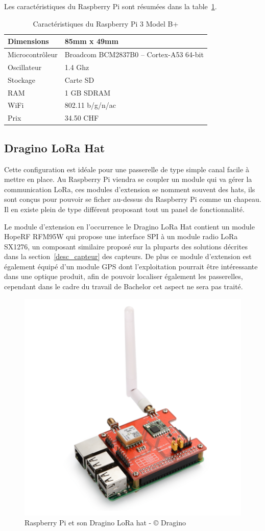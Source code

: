 Les caractéristiques du Raspberry Pi sont résumées dans la table~\ref{tab:raspberry_cara}.

\begin{table}[htb]
\caption[Caractéristiques du Raspberry Pi 3 Model B+]{Caractéristiques du Raspberry Pi 3 Model B+}
\label{tab:raspberry_cara}
\centering
\begin{tabular}{ l | l }
\toprule
Dimensions & 85mm x 49mm \\
\midrule
Microcontrôleur & Broadcom BCM2837B0 – Cortex-A53 64-bit \\
\midrule
Oscillateur & 1.4 Ghz \\
\midrule
Stockage & Carte SD \\
\midrule
RAM & 1 GB SDRAM \\
\midrule
WiFi & 802.11 b/g/n/ac \\
\midrule
Prix & 34.50 CHF\\
\bottomrule 
\end{tabular}
\end{table}

\subsection{Dragino LoRa Hat}

Cette configuration est idéale pour une passerelle de type simple canal facile à mettre en place. 
Au Raspberry Pi viendra se coupler un module qui va gérer la communication LoRa, ces modules d’extension se nomment souvent des hats, ils sont conçus pour pouvoir se ficher au-dessus du Raspberry Pi comme un chapeau. Il en existe plein de type différent proposant tout un panel de fonctionnalité. 

Le module d’extension en l’occurrence le Dragino LoRa Hat contient un module HopeRF RFM95W qui propose une interface SPI à un module radio LoRa SX1276, un composant similaire proposé sur la pluparts des solutions décrites dans la section~\ref{desc_capteur} des capteurs. De plus ce module d’extension est également équipé d’un module GPS dont l’exploitation pourrait être intéressante dans une optique produit, afin de pouvoir localiser également les passerelles, cependant dans le cadre du travail de Bachelor cet aspect ne sera pas traité.

\begin{figure}[htb]
\centering 
\includegraphics[width=0.5\columnwidth]{../images/RaspberryPI_DraginoHat.png} 
\caption[Raspberry Pi et son Dragino LoRa hat]{Raspberry Pi et son Dragino LoRa hat - © Dragino}
\label{fig:rpi_dragino_hat}
\end{figure}

